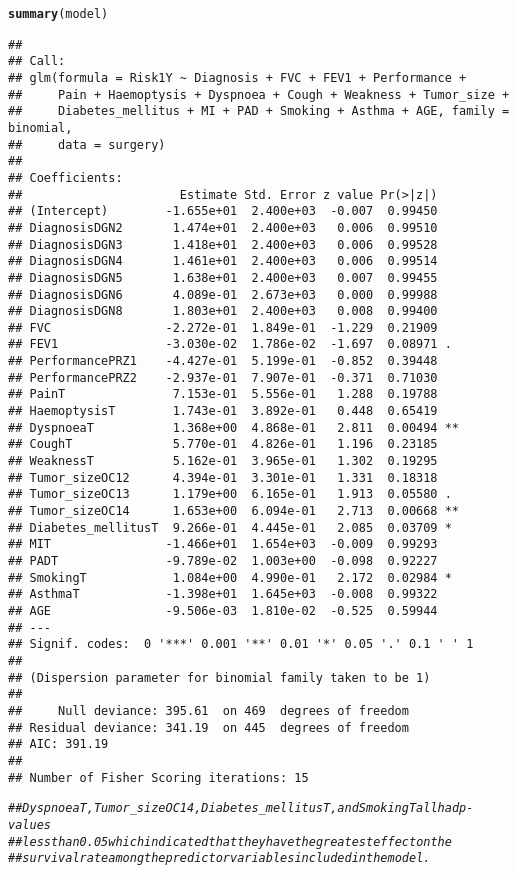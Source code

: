 \documentclass{article}\usepackage[]{graphicx}\usepackage[]{xcolor}
\makeatletter
\newcommand{\hlcom}[1]{\textcolor[rgb]{0.678,0.584,0.686}{\textit{#1}}}%
\newcommand{\hlstd}[1]{\textcolor[rgb]{0.345,0.345,0.345}{#1}}%
\newcommand{\hlkwd}[1]{\textcolor[rgb]{0.737,0.353,0.396}{\textbf{#1}}}%
\newenvironment{kframe}{%
 \def\at@end@of@kframe{}%
 \ifinner\ifhmode%
  \def\at@end@of@kframe{\end{minipage}}%
  \begin{minipage}{\columnwidth}%
 \fi\fi%
 \def\FrameCommand##1{\hskip\@totalleftmargin \hskip-\fboxsep
 \colorbox{shadecolor}{##1}\hskip-\fboxsep
     \hskip-\linewidth \hskip-\@totalleftmargin \hskip\columnwidth}%
 \MakeFramed {\advance\hsize-\width
   \@totalleftmargin\z@ \linewidth\hsize
   \@setminipage}}%
 {\par\unskip\endMakeFramed%
 \at@end@of@kframe}
\newenvironment{knitrout}{}{} %
\makeatother
\begin{document}
\begin{knitrout}
\begin{kframe}
\begin{alltt}
\hlkwd{summary}\hlstd{(model)}
\end{alltt}
\begin{verbatim}
## 
## Call:
## glm(formula = Risk1Y ~ Diagnosis + FVC + FEV1 + Performance + 
##     Pain + Haemoptysis + Dyspnoea + Cough + Weakness + Tumor_size + 
##     Diabetes_mellitus + MI + PAD + Smoking + Asthma + AGE, family = binomial, 
##     data = surgery)
## 
## Coefficients:
##                      Estimate Std. Error z value Pr(>|z|)   
## (Intercept)        -1.655e+01  2.400e+03  -0.007  0.99450   
## DiagnosisDGN2       1.474e+01  2.400e+03   0.006  0.99510   
## DiagnosisDGN3       1.418e+01  2.400e+03   0.006  0.99528   
## DiagnosisDGN4       1.461e+01  2.400e+03   0.006  0.99514   
## DiagnosisDGN5       1.638e+01  2.400e+03   0.007  0.99455   
## DiagnosisDGN6       4.089e-01  2.673e+03   0.000  0.99988   
## DiagnosisDGN8       1.803e+01  2.400e+03   0.008  0.99400   
## FVC                -2.272e-01  1.849e-01  -1.229  0.21909   
## FEV1               -3.030e-02  1.786e-02  -1.697  0.08971 . 
## PerformancePRZ1    -4.427e-01  5.199e-01  -0.852  0.39448   
## PerformancePRZ2    -2.937e-01  7.907e-01  -0.371  0.71030   
## PainT               7.153e-01  5.556e-01   1.288  0.19788   
## HaemoptysisT        1.743e-01  3.892e-01   0.448  0.65419   
## DyspnoeaT           1.368e+00  4.868e-01   2.811  0.00494 **
## CoughT              5.770e-01  4.826e-01   1.196  0.23185   
## WeaknessT           5.162e-01  3.965e-01   1.302  0.19295   
## Tumor_sizeOC12      4.394e-01  3.301e-01   1.331  0.18318   
## Tumor_sizeOC13      1.179e+00  6.165e-01   1.913  0.05580 . 
## Tumor_sizeOC14      1.653e+00  6.094e-01   2.713  0.00668 **
## Diabetes_mellitusT  9.266e-01  4.445e-01   2.085  0.03709 * 
## MIT                -1.466e+01  1.654e+03  -0.009  0.99293   
## PADT               -9.789e-02  1.003e+00  -0.098  0.92227   
## SmokingT            1.084e+00  4.990e-01   2.172  0.02984 * 
## AsthmaT            -1.398e+01  1.645e+03  -0.008  0.99322   
## AGE                -9.506e-03  1.810e-02  -0.525  0.59944   
## ---
## Signif. codes:  0 '***' 0.001 '**' 0.01 '*' 0.05 '.' 0.1 ' ' 1
## 
## (Dispersion parameter for binomial family taken to be 1)
## 
##     Null deviance: 395.61  on 469  degrees of freedom
## Residual deviance: 341.19  on 445  degrees of freedom
## AIC: 391.19
## 
## Number of Fisher Scoring iterations: 15
\end{verbatim}
\begin{alltt}
\hlcom{## DyspnoeaT, Tumor_sizeOC14, Diabetes_mellitusT, and SmokingT all had p-values}
\hlcom{## less than 0.05 which indicated that they have the greatest effect on the }
\hlcom{## survival rate among the predictor variables included in the model.  }



\end{alltt}
\end{kframe}
\end{knitrout}
\end{document}
